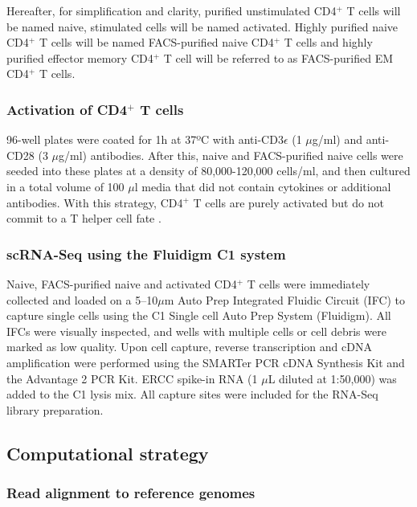 \newpage

Hereafter, for simplification and clarity, purified unstimulated CD4$^+$ T cells will be named naive, stimulated cells will be named activated. Highly purified naive CD4$^+$ T cells will be named FACS-purified naive CD4$^+$ T cells and highly purified effector memory CD4$^+$ T cell will be referred to as FACS-purified EM CD4$^+$ T cells.

\subsubsection{Activation of CD4$^+$ T cells}

96-well plates were coated for 1h at 37ºC with anti-CD3$\epsilon$ (1 $\mu$g/ml) and anti-CD28 (3 $\mu$g/ml) antibodies. After this, naive and FACS-purified naive cells were seeded into these plates at a density of 80,000-120,000 cells/ml, and then cultured in a total volume of 100 $\mu$l media that did not contain cytokines or additional antibodies. With this strategy, CD4$^+$ T cells are purely activated but do not commit to a T helper cell fate \citep{Stubbington2015, Zhu2010}.

\subsubsection{scRNA-Seq using the Fluidigm C1 system}

Naive, FACS-purified naive and activated CD4$^+$ T cells were immediately collected and loaded on a 5–10$\mu$m Auto Prep Integrated Fluidic Circuit (IFC) to capture single cells using the C1 Single cell Auto Prep System (Fluidigm). All IFCs were visually inspected, and wells with multiple cells or cell debris were marked as low quality. Upon cell capture, reverse transcription and cDNA amplification were performed using the SMARTer PCR cDNA Synthesis Kit and the Advantage 2 PCR Kit. ERCC spike-in RNA (1 $\mu$L diluted at 1:50,000) was added to the C1 lysis mix. All capture sites were included for the RNA-Seq library preparation.

\subsection{Computational strategy}

\subsubsection{Read alignment to reference genomes}

